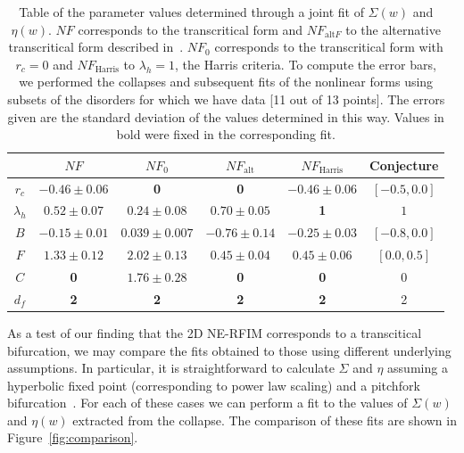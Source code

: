 \documentclass[reprint,amsmath,amssymb,aps,floatfix]{revtex4-1}
\begin{document}
\begin{table}
	\centering
	\begin{tabular}{|c|c|c|c|c|c|}
	\hline
	& $NF$ & $NF_0$ & $NF_{\textrm{alt}}$ & $NF_{\textrm{Harris}}$ & Conjecture\\
	\hline
	$r_c$ & $-0.46 \pm 0.06$ & \textbf{0} &  \textbf{0} & $-0.46\pm0.06$ & $[-0.5,0.0]$\\
	$\lambda_h$ & $0.52 \pm 0.07$ & $0.24\pm0.08$ & $0.70\pm0.05$ & \textbf{1} & $1$\\
	$B$ & $-0.15 \pm 0.01$ & $0.039\pm0.007$ & $-0.76\pm0.14$ & $-0.25\pm0.03$ & $[-0.8, 0.0]$\\
	$F$ & $1.33 \pm 0.12$ & $2.02\pm0.13$ & $0.45\pm0.04$ & $0.45\pm0.06$ & $[0.0,0.5]$\\
	$C$ & \textbf{0} & $1.76\pm0.28$ &  \textbf{0} & \textbf{0} & 0\\
	$d_f$ & \textbf{2} & \textbf{2} & \textbf{2} & \textbf{2} & 2\\
	\hline
	\end{tabular}
		\caption{Table of the parameter values determined through a joint fit of $\Sigma(w)$ and $\eta(w)$. $NF$ corresponds to the transcritical form and $NF_{\textrm{alt}F}$ to the alternative transcritical form described in~\cite[Section~\ref{supp-app:well-behaved}]{RFIM2Dsupp}. $NF_0$ corresponds to the transcritical form with $r_c=0$ and $NF_{\textrm{Harris}}$ to $\lambda_h=1$, the Harris criteria. To compute the error bars,  we performed the collapses and subsequent fits of the nonlinear forms using subsets of the disorders for which we have data [11 out of 13 points]. The errors given are the standard deviation of the values determined in this way. Values in bold were fixed in the corresponding fit. }
	\label{tab:params}
\end{table}
%
As a test of our finding that the 2D NE-RFIM corresponds to a transcitical bifurcation, we may compare the fits obtained to those using different underlying assumptions. In particular, it is straightforward to calculate $\Sigma$ and $\eta$ assuming a hyperbolic fixed point (corresponding to power law scaling) and a pitchfork bifurcation~\cite[Section~\ref{supp-app:compare}]{RFIM2Dsupp}. For each of these cases we can perform a fit to the values of $\Sigma(w)$ and $\eta(w)$ extracted from the collapse. The comparison of these fits are shown in Figure~\ref{fig:comparison}.\par
%
\end{document}

